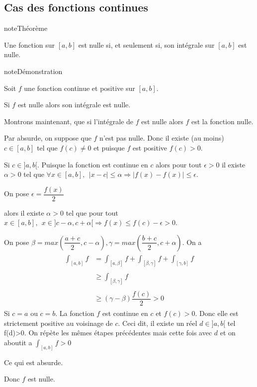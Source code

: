\documentclass[letterpaper,10pt,french]{sphinxmanual}
\begin{document}
\subsection{Cas des fonctions continues}
\label{\detokenize{pptint:cas-des-fonctions-continues}}
\begin{sphinxadmonition}{note}{Théorème}

\sphinxAtStartPar
Une fonction  sur \([a, b]\) est nulle si, et seulement si, son intégrale sur \([a, b]\) est nulle.
\end{sphinxadmonition}

\begin{sphinxadmonition}{note}{Démonstration}

\sphinxAtStartPar
Soit \(f\) une fonction continue et positive sur \([a, b]\).

\sphinxAtStartPar
Si \(f\) est nulle alors son intégrale est nulle.

\sphinxAtStartPar
Montrons maintenant, que si l’intégrale de \(f\) est nulle alors \(f\) est la fonction nulle.

\sphinxAtStartPar
Par absurde, on suppose que \(f\) n’est pas nulle. Donc il existe (au moins) \(c \in [a, b]\) tel que \(f(c) \neq 0\) et puisque \(f\) est positive \(f(c) > 0\).

\sphinxhyphen{} Si \(c \in ]a, b[\). Puisque la fonction est continue en \(c\) alors pour tout \(\epsilon >0\) il existe \(\alpha > 0\) tel que \(\forall x \in [a, b],~~ |x-c| \leq \alpha \Rightarrow |f(x) - f(x)|\leq \epsilon\).

\sphinxAtStartPar
On pose \(\epsilon = \dfrac{f(x)}{2}\)

\sphinxAtStartPar
alors il existe \(\alpha>0\) tel que pour tout \(x\in [a, b], ~~ x \in ]c-\alpha, c +\alpha[ \Rightarrow f(x)\leq f(c)-\epsilon > 0\).

\sphinxAtStartPar
On pose \(\beta = max(\dfrac{a+c}{2}, c-\alpha), \gamma = max(\dfrac{b+c}{2}, c+\alpha)\). On a
\begin{equation*}
\begin{split}
\begin{aligned}
\int_{[a, b]}f &= \int_{[a, \beta]}f + \int_{[\beta, \gamma]}f + \int_{[\gamma, b]}f \\ \\
&\geq  \int_{[\beta, \gamma]}f \\ \\
&\geq  (\gamma -\beta )\dfrac{f(c)}{2}> 0
\end{aligned}
\end{split}
\end{equation*}
\sphinxhyphen{} Si \(c =a\) ou \(c=b\). La fonction \(f\) est continue en \(c\) et \(f(c)>0\). Donc elle est strictement positive au voisinage de \(c\). Ceci dit, il existe un réel \(d \in ]a, b[\) tel f(d)\textgreater{}0. On répète les mêmes étapes précédentes mais cette fois avec \(d\) et on aboutit a \(\int_{[a, b]}f >0\)

\sphinxAtStartPar
Ce qui est absurde.

\sphinxAtStartPar
Donc \(f\) est nulle.
\end{sphinxadmonition}
\end{document}
